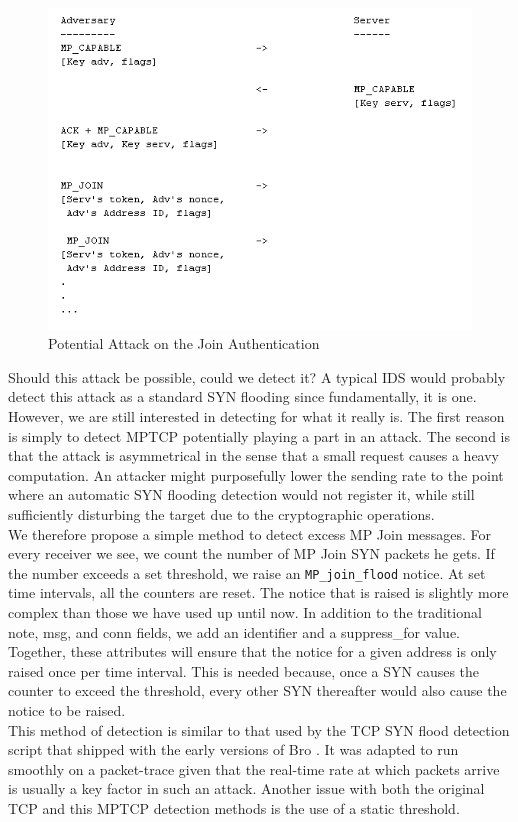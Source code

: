 \begin{figure}[!t]
\centering
\includegraphics[scale = 0.75]{Figures/joinflood.png}
\caption{Potential Attack on the Join Authentication}
\label{pic:join flood}
\end{figure}

Should this attack be possible, could we detect it? A typical IDS would probably detect this attack as a standard SYN flooding since fundamentally, it is one. However, we are still interested in detecting for what it really is. The first reason is simply to detect MPTCP potentially playing a part in an attack. The second is that the attack is asymmetrical in the sense that a small request causes a heavy computation. An attacker might purposefully lower the sending rate to the point where an automatic SYN flooding detection would not register it, while still sufficiently disturbing the target due to the cryptographic operations.\\

We therefore propose a simple method to detect excess MP Join messages. For every receiver we see, we count the number of MP Join SYN packets he gets. If the number exceeds a set threshold, we raise an \texttt{MP\_join\_flood} notice. At set time intervals, all the counters are reset. The notice that is raised is slightly more complex than those we have used up until now. In addition to the traditional note, msg, and conn fields, we add an identifier and a suppress\_for value. Together, these attributes will ensure that the notice for a given address is only raised once per time interval. This is needed because, once a SYN causes the counter to exceed the threshold, every other SYN thereafter would also cause the notice to be raised. \\

This method of detection is similar to that used by the TCP SYN flood detection script that shipped with the early versions of Bro \cite{synflood}. It was adapted to run smoothly on a packet-trace given that the real-time rate at which packets arrive is usually a key factor in such an attack. Another issue with both the original TCP and this MPTCP detection methods is the use of a static threshold.

